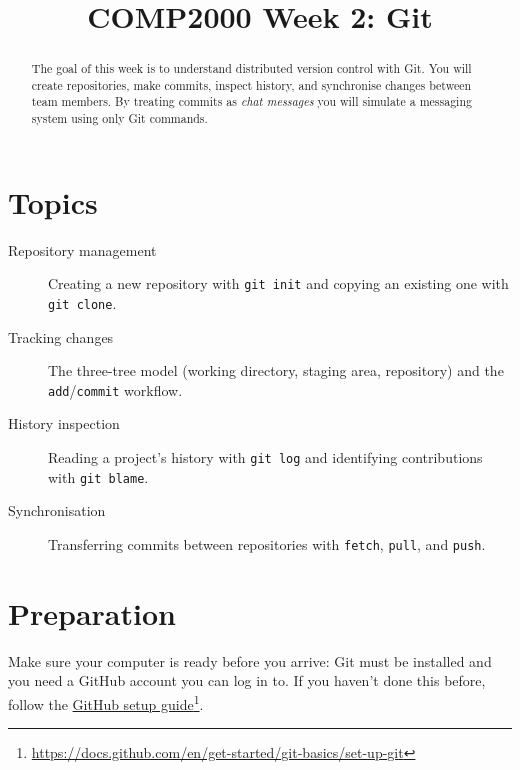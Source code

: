 \documentclass[twoside=false,DIV=14]{scrartcl}
\title{\color{redish} \vspace{-1em}COMP2000 Week 2: Git}
\begin{document}
{\color{blackish}\maketitle}\vspace{-7em}

\begin{abstract}
The goal of this week is to understand distributed version control with Git.  You will create repositories, make commits, inspect history, and synchronise changes between team members.  By treating commits as \emph{chat messages} you will simulate a messaging system using only Git commands.
\end{abstract}

\section*{Topics}
\begin{description}
\item[Repository management] Creating a new repository with \texttt{git init} and copying an existing one with \texttt{git clone}.
\item[Tracking changes] The three-tree model (working directory, staging area, repository) and the \texttt{add}/\texttt{commit} workflow.
\item[History inspection] Reading a project's history with \texttt{git log} and identifying contributions with \texttt{git blame}.
\item[Synchronisation] Transferring commits between repositories with \texttt{fetch}, \texttt{pull}, and \texttt{push}.
\end{description}

\section*{Preparation}
Make sure your computer is ready before you arrive: Git must be installed and you need a GitHub account you can log in to.  If you haven't done this before, follow the \href{https://docs.github.com/en/get-started/git-basics/set-up-git}{GitHub setup guide}\footnote{\url{https://docs.github.com/en/get-started/git-basics/set-up-git}}.
\end{document}
